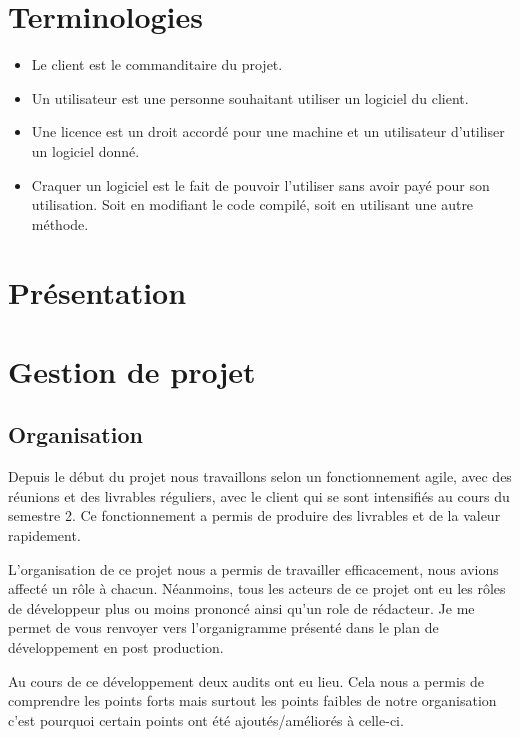 \chapter{Terminologies}

\begin{itemize}
	\item Le client est le commanditaire du projet.
	\item Un utilisateur est une personne souhaitant utiliser un logiciel du client. 
	\item Une licence est un droit accordé pour une machine et un utilisateur d'utiliser un logiciel donné.
	\item Craquer un logiciel est le fait de pouvoir l'utiliser sans avoir payé pour son utilisation. 
	Soit en modifiant le code compilé, soit en utilisant une autre méthode. 
\end{itemize}

\chapter{Présentation}

\chapter{Gestion de projet}

\section{Organisation}

Depuis le début du projet nous travaillons selon un fonctionnement agile, avec des
réunions et des livrables réguliers, avec le client qui se sont intensifiés au cours du semestre 2. Ce fonctionnement a permis de produire des livrables et de
la valeur rapidement.\newline

L'organisation de ce projet nous a permis de travailler efficacement, nous avions affecté un rôle à
chacun. Néanmoins, tous les acteurs de ce projet ont eu les rôles de développeur plus ou moins prononcé ainsi qu'un role de
rédacteur. Je me permet de vous renvoyer vers l'organigramme présenté dans le plan de développement en post production.\newline

Au cours de ce développement deux audits ont eu lieu. Cela nous a permis de comprendre les points forts mais surtout les points faibles de notre
organisation c'est pourquoi certain points ont été ajoutés/améliorés à celle-ci. \newline

